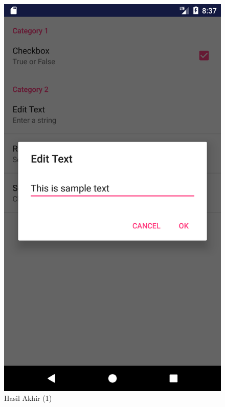 \documentclass{scrartcl}
\begin{document}
\begin{enumerate}
		\begin{figure}[htbp]
			\begin{minipage}{.5\textwidth}
				\centering
				\includegraphics[width=0.7\linewidth]{Screenshot_1497490676}
				\caption{Hasil Akhir (1)}
				\label{fig:screenshot_1497490676}
			\end{minipage}%
			\begin{minipage}{.5\textwidth}
				\centering

\end{minipage}
\end{figure}
\end{enumerate}
\end{document}
